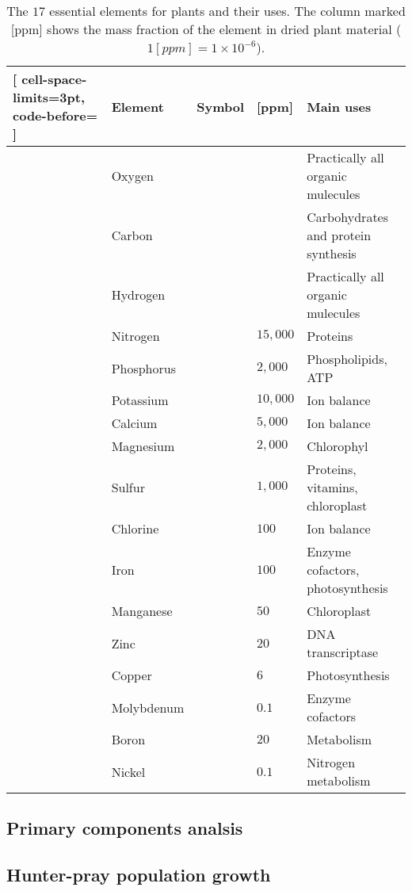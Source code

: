 \begin{table}[htpb]
	\centering
	\caption{The $17$ essential elements for plants and their uses. The column marked [\si{ppm}] shows the mass fraction of the element in dried plant material ($1 [\si{ppm}]=1 \times 10^{-6}$).}
	\label{tab:plant_nutrients}
	\begin{NiceTabular}{p{3mm}lcll}[
			cell-space-limits=3pt, code-before= 
		]
		\toprule
		\RowStyle{\bfseries} & Element & Symbol & [ppm] & Main uses \\
		\midrule
		& Oxygen &  & & Practically all organic mulecules \\
		& Carbon &  & & Carbohydrates and protein synthesis \\
		& Hydrogen &  & & Practically all organic mulecules \\
		\midrule
		& Nitrogen &  & $15,000$ & Proteins \\
		& Phosphorus &  & $2,000$ & Phospholipids, ATP \\
		& Potassium &  & $10,000$ & Ion balance \\
		& Calcium &  & $5,000$ & Ion balance \\
		& Magnesium &  & $2,000$ & Chlorophyl \\
		& Sulfur &  & $1,000$& Proteins, vitamins, chloroplast \\
		\midrule
		& Chlorine &  & $100$ & Ion balance \\
		& Iron &  & $100$ & Enzyme cofactors, photosynthesis \\
		& Manganese &  & $50$ & Chloroplast \\
		& Zinc &  & $20$ & DNA transcriptase \\
		& Copper &  & $6$ & Photosynthesis \\
		& Molybdenum &  & $0.1$ & Enzyme cofactors \\
		& Boron &  & $20$ & Metabolism \\
		& Nickel &  & $0.1$ & Nitrogen metabolism \\
		\bottomrule
	\end{NiceTabular}
\end{table}


\subsection{Primary components analsis}

\subsection{Hunter-pray population growth}
